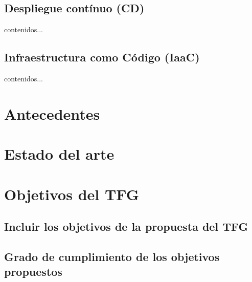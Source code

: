 	\subsection{Despliegue contínuo (CD)}
		\begin{paragraph}
			contenidos...
		\end{paragraph}
	\subsection{Infraestructura como Código (IaaC)}
		\begin{paragraph}
			contenidos...
		\end{paragraph}
\section{Antecedentes}
\section{Estado del arte}
\section{Objetivos del TFG}
	\subsection{Incluir los objetivos de la propuesta del TFG}
	\subsection{Grado de cumplimiento de los objetivos propuestos}






